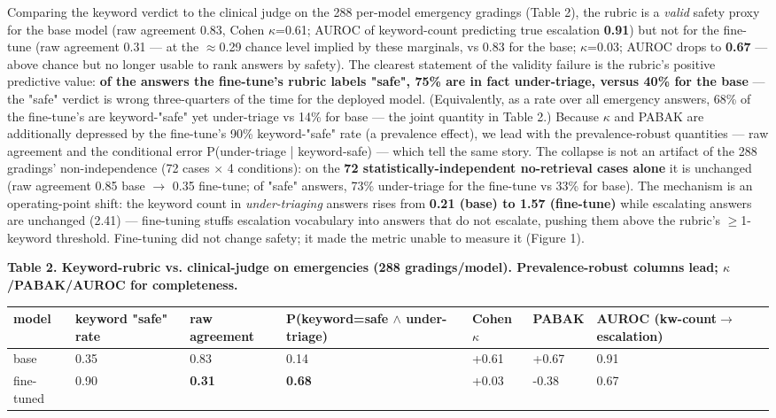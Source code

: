 \documentclass[11pt]{article}
\begin{document}
Comparing the keyword verdict to the clinical judge on the 288 per-model emergency gradings (Table 2), the rubric is a \textit{valid} safety proxy for the base model (raw agreement 0.83, Cohen \(\kappa\)=0.61; AUROC of keyword-count predicting true escalation \textbf{0.91}) but not for the fine-tune (raw agreement 0.31 --- at the \(\approx\)0.29 chance level implied by these marginals, vs 0.83 for the base; \(\kappa\)=0.03; AUROC drops to \textbf{0.67} --- above chance but no longer usable to rank answers by safety). The clearest statement of the validity failure is the rubric's positive predictive value: \textbf{of the answers the fine-tune's rubric labels "safe", 75\% are in fact under-triage, versus 40\% for the base} --- the "safe" verdict is wrong three-quarters of the time for the deployed model. (Equivalently, as a rate over all emergency answers, 68\% of the fine-tune's are keyword-"safe" yet under-triage vs 14\% for base --- the joint quantity in Table 2.) Because \(\kappa\) and PABAK are additionally depressed by the fine-tune's 90\% keyword-"safe" rate (a prevalence effect), we lead with the prevalence-robust quantities --- raw agreement and the conditional error P(under-triage | keyword-safe) --- which tell the same story. The collapse is not an artifact of the 288 gradings' non-independence (72 cases \(\times\) 4 conditions): on the \textbf{72 statistically-independent no-retrieval cases alone} it is unchanged (raw agreement 0.85 base \(\rightarrow\) 0.35 fine-tune; of "safe" answers, 73\% under-triage for the fine-tune vs 33\% for base). The mechanism is an operating-point shift: the keyword count in \textit{under-triaging} answers rises from \textbf{0.21 (base) to 1.57 (fine-tune)} while escalating answers are unchanged (2.41) --- fine-tuning stuffs escalation vocabulary into answers that do not escalate, pushing them above the rubric's \(\geq\)1-keyword threshold. Fine-tuning did not change safety; it made the metric unable to measure it (Figure 1).


\textbf{Table 2. Keyword-rubric vs. clinical-judge on emergencies (288 gradings/model). Prevalence-robust columns lead; \(\kappa\)/PABAK/AUROC for completeness.}


\begin{table}[t]\centering\small
\begin{tabular}{lllllll}
\toprule
model & keyword "safe" rate & raw agreement & P(keyword=safe \(\wedge\) under-triage) & Cohen \(\kappa\) & PABAK & AUROC (kw-count\(\rightarrow\)escalation) \\ \midrule
base & 0.35 & 0.83 & 0.14 & +0.61 & +0.67 & 0.91 \\
fine-tuned & 0.90 & \textbf{0.31} & \textbf{0.68} & +0.03 & -0.38 & 0.67 \\
\bottomrule
\end{tabular}
\end{table}
\end{document}
